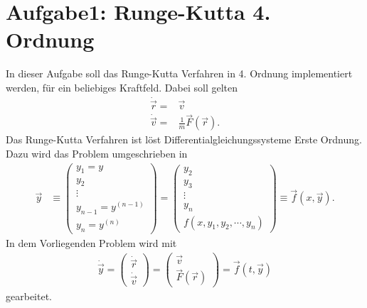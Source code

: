 
\section*{Aufgabe1: Runge-Kutta 4. Ordnung}
In dieser Aufgabe soll das Runge-Kutta Verfahren in 4. Ordnung implementiert werden, für ein beliebiges Kraftfeld.
Dabei soll gelten
\begin{align}
	\dot{\vec{r}}=&\vec{v}\\
	\dot{\vec{v}}=&\frac{1}{m}\vec{F}(\vec{r}).
\end{align}
Das Runge-Kutta Verfahren ist löst Differentialgleichungssysteme Erste Ordnung. Dazu wird das Problem umgeschrieben in
\begin{align}
	\vec{y}&\equiv
	\begin{pmatrix}
	y_1=y\\ y_2\\ \vdots\\y_{n-1}=y^{(n-1)}\\ y_n=y^{(n)}
	\end{pmatrix}=
	\begin{pmatrix}
		y_2\\y_3\\\vdots\\y_n\\f(x,y_1,y_2,\cdots,y_n)
	\end{pmatrix}
	\equiv\vec{f}(x,\vec{y}).
\end{align}
In dem Vorliegenden Problem wird mit
\begin{align}
	\dot{\vec{y}}=\begin{pmatrix}
		\dot{\vec{r}}\\\dot{\vec{v}}
	\end{pmatrix}
	=
	\begin{pmatrix}
	\vec{v}\\\vec{F}(\vec{r})	
	\end{pmatrix}
	=\vec{f}(t,\vec{y})
\end{align}
gearbeitet.
